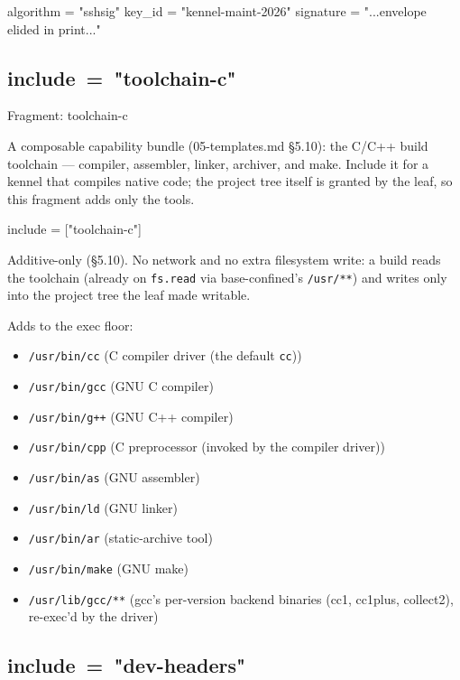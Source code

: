 \begin{kennelcode}
[signature]
algorithm = "sshsig"
key_id = "kennel-maint-2026"
signature = "...envelope elided in print..."
\end{kennelcode}

\hypertarget{include-toolchain-c}{%
\subsection{\texorpdfstring{include\ =\ "toolchain-c"}{include = "toolchain-c"}}\label{include-toolchain-c}}

Fragment: toolchain-c

A composable capability bundle (05-templates.md §5.10): the C/C++ build
toolchain --- compiler, assembler, linker, archiver, and make. Include
it for a kennel that compiles native code; the project tree itself is
granted by the leaf, so this fragment adds only the tools.

\begin{kennelcode}
include = ["toolchain-c"]
\end{kennelcode}

Additive-only (§5.10). No network and no extra filesystem write: a build
reads the toolchain (already on \texttt{fs.read} via base-confined's
\texttt{/usr/**}) and writes only into the project tree the leaf made
writable.

Adds to the exec floor:

\begin{itemize}
\tightlist
\item
  \texttt{/usr/bin/cc} (C compiler driver (the default \texttt{cc}))
\item
  \texttt{/usr/bin/gcc} (GNU C compiler)
\item
  \texttt{/usr/bin/g++} (GNU C++ compiler)
\item
  \texttt{/usr/bin/cpp} (C preprocessor (invoked by the compiler
  driver))
\item
  \texttt{/usr/bin/as} (GNU assembler)
\item
  \texttt{/usr/bin/ld} (GNU linker)
\item
  \texttt{/usr/bin/ar} (static-archive tool)
\item
  \texttt{/usr/bin/make} (GNU make)
\item
  \texttt{/usr/lib/gcc/**} (gcc's per-version backend binaries (cc1,
  cc1plus, collect2), re-exec'd by the driver)
\end{itemize}

\hypertarget{include-dev-headers}{%
\subsection{\texorpdfstring{include\ =\ "dev-headers"}{include = "dev-headers"}}\label{include-dev-headers}}

